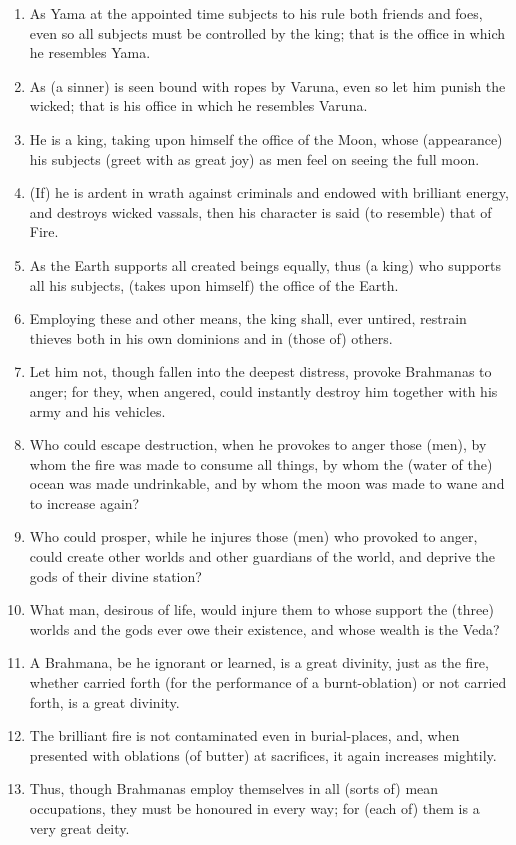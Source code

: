 \begin{enumerate}
\item As Yama at the appointed time subjects to his rule both friends and foes, even so all subjects must be controlled by the king; that is the office in which he resembles Yama.
\item As (a sinner) is seen bound with ropes by Varuna, even so let him punish the wicked; that is his office in which he resembles Varuna.
\item He is a king, taking upon himself the office of the Moon, whose (appearance) his subjects (greet with as great joy) as men feel on seeing the full moon.
\item (If) he is ardent in wrath against criminals and endowed with brilliant energy, and destroys wicked vassals, then his character is said (to resemble) that of Fire.
\item As the Earth supports all created beings equally, thus (a king) who supports all his subjects, (takes upon himself) the office of the Earth.
\item Employing these and other means, the king shall, ever untired, restrain thieves both in his own dominions and in (those of) others.
\item Let him not, though fallen into the deepest distress, provoke Brahmanas to anger; for they, when angered, could instantly destroy him together with his army and his vehicles.
\item Who could escape destruction, when he provokes to anger those (men), by whom the fire was made to consume all things, by whom the (water of the) ocean was made undrinkable, and by whom the moon was made to wane and to increase again?
\item Who could prosper, while he injures those (men) who provoked to anger, could create other worlds and other guardians of the world, and deprive the gods of their divine station?
\item What man, desirous of life, would injure them to whose support the (three) worlds and the gods ever owe their existence, and whose wealth is the Veda?
\item A Brahmana, be he ignorant or learned, is a great divinity, just as the fire, whether carried forth (for the performance of a burnt-oblation) or not carried forth, is a great divinity.
\item The brilliant fire is not contaminated even in burial-places, and, when presented with oblations (of butter) at sacrifices, it again increases mightily.
\item Thus, though Brahmanas employ themselves in all (sorts of) mean occupations, they must be honoured in every way; for (each of) them is a very great deity.

\end{enumerate}
